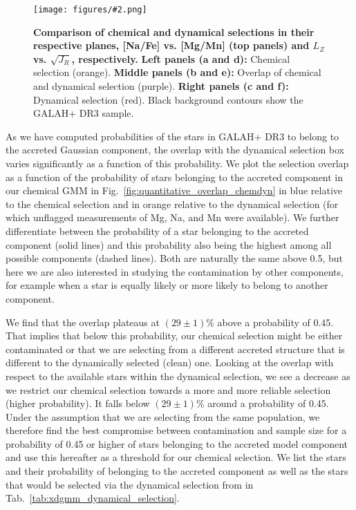 \documentclass[fleqn,usenatbib]{mnras}
\newcommand{\codeicon}{{\faCloudDownload}}
\newcommand{\codelink}[1]{\href{https://github.com/svenbuder/buder_galah_accreted_chemistry/tree/main/figures/#1.ipynb}{\codeicon}\,\,}
\newcommand{\oscaption}[2]{\caption{#2 \codelink{#1}}}
\newcommand{\figuretextwidth}[4]{\begin{figure*} \centering \texttt{[image: figures/\#2.png]}\oscaption{#3}{#4}\label{fig:#2} \end{figure*}}
\begin{document}
\figuretextwidth{17cm}{chemdyn_selection_plane}{chronochemodynamic_comparison}{
\textbf{Comparison of chemical and dynamical selections in their respective planes, [Na/Fe] vs. [Mg/Mn] (top panels) and $L_Z$ vs. $\sqrt{J_R}$, respectively.}
\textbf{Left panels (a and d):} Chemical selection (orange).
\textbf{Middle panels (b and e):} Overlap of chemical and dynamical selection (purple).
\textbf{Right panels (c and f):} Dynamical selection (red).
Black background contours show the GALAH+ DR3 sample.
}


As we have computed probabilities of the stars in GALAH+ DR3 to belong to the accreted Gaussian component, the overlap with the dynamical selection box varies significantly as a function of this probability. We plot the selection overlap as a function of the probability of stars belonging to the accreted component in our chemical GMM in Fig.~\ref{fig:quantitative_overlap_chemdyn} in blue relative to the chemical selection and in orange relative to the dynamical selection (for which unflagged measurements of Mg, Na, and Mn were available). We further differentiate between the probability of a star belonging to the accreted component (solid lines) and this probability also being the highest among all possible components (dashed lines). Both are naturally the same above 0.5, but here we are also interested in studying the contamination by other components, for example when a star is equally likely or more likely to belong to another component. 

We find that the overlap plateaus at $(29\pm1)\%$ above a probability of 0.45. That implies that below this probability, our chemical selection might be either contaminated or that we are selecting from a different accreted structure that is different to the dynamically selected (clean) one. Looking at the overlap with respect to the available stars within the dynamical selection, we see a decrease as we restrict our chemical selection towards a more and more reliable selection (higher probability). It falls below $(29\pm1)\%$ around a probability of 0.45. Under the assumption that we are selecting from the same population, we therefore find the best compromise between contamination and sample size for a probability of 0.45 or higher of stars belonging to the accreted model component and use this hereafter as a threshold for our chemical selection. We list the stars and their probability of belonging to the accreted component as well as the stars that would be selected via the dynamical selection from \citet{Feuillet2021} in Tab.~\ref{tab:xdgmm_dynamical_selection}.
\end{document}
